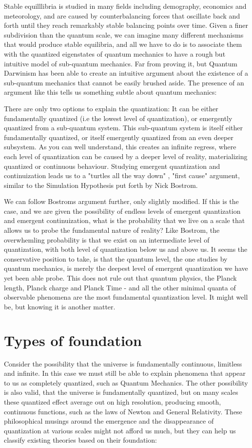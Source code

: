 \documentclass[notitlepage]{report}
\begin{document}
Stable equilllibria is studied in many fields including demography, economics and meteorology, and are caused by counterbalancing forces that oscillate back and forth until they reach remarkably stable balancing points over time. Given a finer subdivision than the quantum scale, we can imagine many different mechanisms that would produce stable equilibria, and all we have to do is to associate them with the quantized eigenstates of quantum mechanics to have a rough but intuitive model of sub-quantum mechanics.
Far from proving it, but Quantum Darwinism has been able to create an intuitive argument about the existence of a sub-quantum mechanics that cannot be easily brushed aside. The presence of an argument like this tells us something subtle about quantum mechanics:

There are only two options to explain the quantization: It can be either fundamentally quantized (i.e the lowest level of quantization), or emergently quantized from a sub-quantum system. This sub-quantum system is itself either fundamentally quantized, or itself emergently quantized from an even deeper subsystem. As you can well understand, this creates an infinite regress, where each level of quantization can be caused by a deeper level of reality, materializing quantized or continuous behaviour. Studying emergent quantization and continuization leads us to a "turtles all the way down" , "first cause" argument, similar to the Simulation Hypothesis put forth by Nick Bostrom.

We can follow Bostroms argument further, only slightly modified. If this is the case, and we are given the possibility of endless levels of emergent quantization and emergent continuization, what is the probability that we live on a scale that allows us to probe the fundamental nature of reality? Like Bostrom, the overwhemling probability is that we exist on an intermediate level of quantization, with both level of quantization below us and above us. It seems the conservative position to take, is that the quantum level, the one studies by quantum mechanics, is merely the deepest level of emergent quantization we have yet been able probe.
This does not rule out that quantum physics, the Planck length, Planck charge and Planck Time - and all the other minimal quanta of observable phenomena are the most fundamental quantization level. It might well be, but knowing it is another matter.

\section*{Types of foundation}
Consider the possibility that the universe is fundamentally continuous, limitless and infinite. In this case we must still be able to explain phenomena that appear to us as completely quantized, such as Quantum Mechanics. The other possibility is also valid, that the universe is fundamentally quantized, but on many scales these quantized effect average out on high resolution, producing smooth, continuous functions, such as the laws of Newton and General Relativity. These philosophical musings around the emergence and the disappearance of quantization at various scales might not afford us much, but they can help us classify existing theories based on their foundation:
\end{document}
